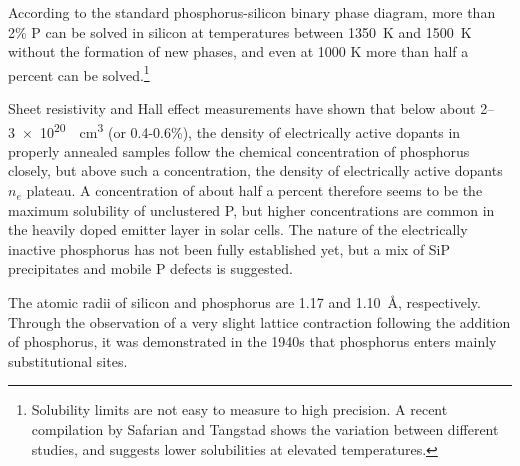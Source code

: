 \documentclass[11pt,bibliography=totoc,index=totoc]{scrbook}   %
\newcommand{\comment}[1]{\hl{#1}}
\begin{document}
According to the standard phosphorus-silicon binary phase diagram,\cite{PSiPhaseDiagram} more than 2\% P can be solved in silicon at temperatures between \SI{1350}{\kelvin} and \SI{1500}{\kelvin} without the formation of new phases, and even at 1000 K more than half a percent can be solved.\footnote{Solubility limits are not easy to measure to high precision. A recent compilation by Safarian and Tangstad shows the variation between different studies, and suggests lower solubilities at elevated temperatures.\cite{Safarian:2011}}

Sheet resistivity and Hall effect measurements have shown that below about 2–\SI{3e20}{\per\centi\metre\cubed} (or 0.4-0.6\%), the density of electrically active dopants in properly annealed samples follow the chemical concentration of phosphorus closely, but above such a concentration, the density of electrically active dopants $n_e$ plateau.\cite{Tannenbaum:1961}
A concentration of about half a percent therefore seems to be the maximum solubility of unclustered P,\cite{Solmi:1998} but higher concentrations
are common in the heavily doped emitter layer in solar cells.\cite{Bentzen:2006b}
The nature of the electrically inactive phosphorus has not been fully established yet, but a mix of SiP precipitates and mobile P defects is suggested.\cite{Armigliato:1976}\cite{Solmi:1996} 


The atomic radii of silicon and phosphorus are 1.17 and 1.10~Å, respectively.
Through the observation of a very slight lattice contraction following the addition of phosphorus,
it was demonstrated in the 1940s that phosphorus enters mainly substitutional sites.\cite{Pearson:1949}

\end{document}

